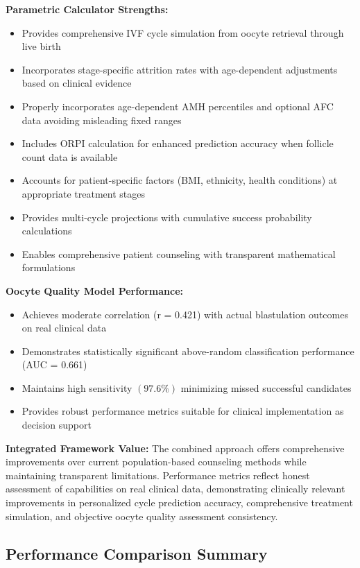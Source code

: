 \textbf{Parametric Calculator Strengths:}
\begin{itemize}
\item Provides comprehensive IVF cycle simulation from oocyte retrieval through live birth
\item Incorporates stage-specific attrition rates with age-dependent adjustments based on clinical evidence
\item Properly incorporates age-dependent AMH percentiles and optional AFC data avoiding misleading fixed ranges
\item Includes ORPI calculation for enhanced prediction accuracy when follicle count data is available
\item Accounts for patient-specific factors (BMI, ethnicity, health conditions) at appropriate treatment stages
\item Provides multi-cycle projections with cumulative success probability calculations
\item Enables comprehensive patient counseling with transparent mathematical formulations
\end{itemize}

\textbf{Oocyte Quality Model Performance:}
\begin{itemize}
\item Achieves moderate correlation (r = 0.421) with actual blastulation outcomes on real clinical data
\item Demonstrates statistically significant above-random classification performance (AUC = 0.661)
\item Maintains high sensitivity $(97.6\%)$ minimizing missed successful candidates
\item Provides robust performance metrics suitable for clinical implementation as decision support
\end{itemize}

\textbf{Integrated Framework Value:}
The combined approach offers comprehensive improvements over current population-based counseling methods while maintaining transparent limitations. Performance metrics reflect honest assessment of capabilities on real clinical data, demonstrating clinically relevant improvements in personalized cycle prediction accuracy, comprehensive treatment simulation, and objective oocyte quality assessment consistency.

\subsection{Performance Comparison Summary}

